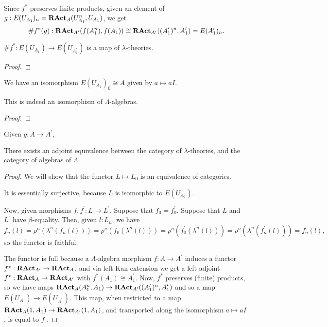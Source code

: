 \begin{definition}
  Since $ f^* $ preserves finite products, given an element of $ g: E(U_{A_1})_n = \mathbf{RAct}_{A}(U_{A_1}^n, U_{A_1}) $, we get
  \[ \# f^*(g): \mathbf{RAct}_{A^\prime}(f(A_1^n), f(A_1)) \cong \mathbf{RAct}_{A^\prime}((A^\prime_1)^n, A^\prime_1) = E(A^\prime_1)_n. \]
\end{definition}

\begin{lemma}
  $ \# f^*: E(U_{A_1}) \to E(U_{A^\prime_1}) $ is a map of $ \lambda $-theories.
\end{lemma}
\begin{proof}
  \TODO
\end{proof}

\begin{definition}
  We have an isomorphism $ E(U_{A_1})_0 \cong A $ given by $ a \mapsto a I $.
\end{definition}

\begin{lemma}
  This is indeed an isomorphism of $ \Lambda $-algebras.
\end{lemma}
\begin{proof}
  \TODO
\end{proof}

\begin{lemma}
  Given $ g: A \to A^\prime $,
\end{lemma}

\begin{theorem}
  There exists an adjoint equivalence between the category of $ \lambda $-theories, and the category of algebras of $ \Lambda $.
\end{theorem}
\begin{proof}
  We will show that the functor $ L \mapsto L_0 $ is an equivalence of categories.

  It is essentially surjective, because $ L $ is isomorphic \TODO to $ E(U_{A_1}) $.

  Now, given morphisms $ f, f^\prime: L \to L^\prime $. Suppose that $ f_0 = f^\prime_0 $. Suppose that $ L $ and $ L^\prime $ have $ \beta $-equality. Then, given $ l: L_n $, we have
  \[ f_n(l) = \rho^n(\lambda^n(f_n(l))) = \rho^n(f_0(\lambda^n(l))) = \rho^n(f^\prime_0(\lambda^n(l))) = \rho^n(\lambda^n(f^\prime_n(l))) = f^\prime_n(l), \]
  so the functor is faithful.

  The functor is full because a $ \Lambda $-algebra morphism $ f: A \to A^\prime $ induces a functor $ f^*: \mathbf{RAct}_{A^\prime} \to \mathbf{RAct}_{A} $, and via left Kan extension we get a left adjoint $ f^*: \mathbf{RAct}_{A} \to \mathbf{RAct}_{A^\prime} $ with $ f^*(A_1) \cong A^\prime_1 $. Now, $ f^* $ preserves (finite) products, so we have maps $ \mathbf{RAct}_{A}(A_1^n, A_1) \to \mathbf{RAct}_{A^\prime}((A^\prime_1)^n, A^\prime_1) $ and so a map $ E(U_{A_1}) \to E(U_{A^\prime_1}) $. This map, when restricted to a map $ \mathbf{RAct}_{A}(1, A_1) \to \mathbf{RAct}_{A^\prime}(1, A_1) $, and transported along the isomorphism $ a \mapsto a I $ \TODO, is equal to $ f $ \TODO.
\end{proof}


